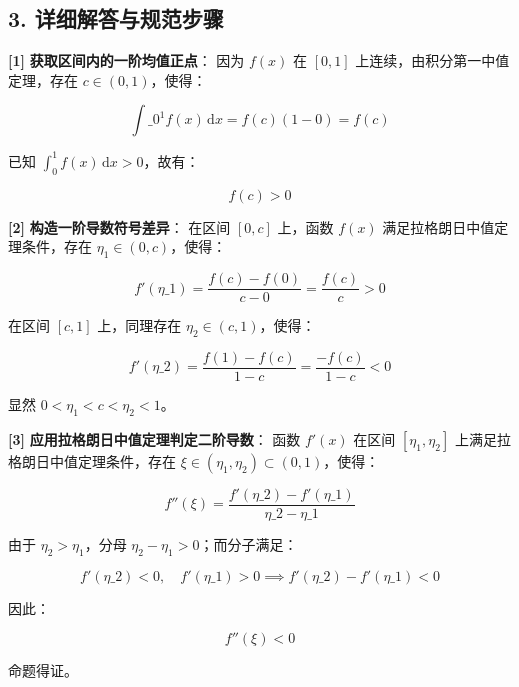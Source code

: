 \documentclass[11pt,a4paper,UTF8]{ctexart}
\begin{document}
\subsection{3. 详细解答与规范步骤}
\begin{solbox}[分步推导与答题规范]
\textbf{[1]}  \textbf{获取区间内的一阶均值正点}：
因为 $f(x)$ 在 $[0, 1]$ 上连续，由积分第一中值定理，存在 $c \in (0, 1)$，使得：

\begin{equation*}
\int\_0^1 f(x)\,\mathrm{d}x = f(c)(1-0) = f(c)
\end{equation*}

已知 $\int_0^1 f(x)\,\mathrm{d}x > 0$，故有：

\begin{equation*}
f(c) > 0
\end{equation*}


\textbf{[2]}  \textbf{构造一阶导数符号差异}：
在区间 $[0, c]$ 上，函数 $f(x)$ 满足拉格朗日中值定理条件，存在 $\eta_1 \in (0, c)$，使得：

\begin{equation*}
f'(\eta\_1) = \frac{f(c) - f(0)}{c - 0} = \frac{f(c)}{c} > 0
\end{equation*}

在区间 $[c, 1]$ 上，同理存在 $\eta_2 \in (c, 1)$，使得：

\begin{equation*}
f'(\eta\_2) = \frac{f(1) - f(c)}{1 - c} = \frac{-f(c)}{1 - c} < 0
\end{equation*}

显然 $0 < \eta_1 < c < \eta_2 < 1$。

\textbf{[3]}  \textbf{应用拉格朗日中值定理判定二阶导数}：
函数 $f'(x)$ 在区间 $[\eta_1, \eta_2]$ 上满足拉格朗日中值定理条件，存在 $\xi \in (\eta_1, \eta_2) \subset (0, 1)$，使得：

\begin{equation*}
f''(\xi) = \frac{f'(\eta\_2) - f'(\eta\_1)}{\eta\_2 - \eta\_1}
\end{equation*}

由于 $\eta_2 > \eta_1$，分母 $\eta_2 - \eta_1 > 0$；而分子满足：

\begin{equation*}
f'(\eta\_2) < 0,\quad f'(\eta\_1) > 0 \implies f'(\eta\_2) - f'(\eta\_1) < 0
\end{equation*}

因此：

\begin{equation*}
f''(\xi) < 0
\end{equation*}

命题得证。
\end{solbox}
\end{document}
